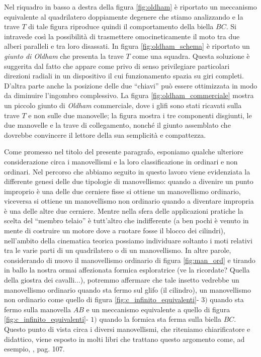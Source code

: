 \noindent Nel riquadro in basso a destra
della figura \ref{fig:oldham} \`e riportato un meccanismo equivalente
al quadrilatero doppiamente degenere che stiamo analizzando e 
la trave $T$ 
di tale figura riproduce quindi il comportamento della
biella $BC$.
\noindent Si intravede cos\`i la possibilit\`a di trasmettere
omocineticamente il moto
tra due alberi paralleli e tra loro disassati. In figura \ref{fig:oldham_schema}
\`e riportato un {\em giunto di Oldham} che presenta la trave $T$ come
una squadra. Questa soluzione \`e suggerita dal fatto che appare come privo di
senso privilegiare particolari direzioni radiali in un dispositivo il cui
funzionamento spazia su giri completi. D'altra
parte anche la posizione delle due ``chiavi'' pu\`o essere ottimizzata in modo
da diminuire l'ingombro complessivo. La figura \ref{fig:oldham_commerciale}
mostra un piccolo giunto di {\em Oldham} commerciale, dove i glifi sono stati
ricavati sulla trave $T$ e non sulle due manovelle; la figura mostra 
i tre componenti disgiunti, le due manovelle e la trave di collegamento,
nonch\'e il giunto
assemblato che dovrebbe convincere il lettore
della sua semplicit\`a e compattezza.

\noindent Come promesso nel titolo del presente paragrafo, esponiamo
qualche ulteriore considerazione circa i manovellismi e la loro classificazione
in ordinari e non ordinari. Nel percorso che abbiamo seguito in questo lavoro
viene evidenziata la differente genesi delle due tipologie di manovellismo:
quando a divenire un punto improprio \`e una delle due cerniere fisse
si ottiene un manovellismo ordinario, viceversa
si ottiene un manovellismo non ordinario quando a diventare impropria \`e
una delle altre due cerniere.  Mentre nella sfera delle applicazioni
pratiche la scelta del ``membro telaio'' \`e tutt'altro che indifferente (a
ben pochi \`e venuto in mente di costruire un motore dove a ruotare fosse
il blocco dei cilindri),
nell'ambito della cinematica teorica possiamo individuare soltanto
i moti relativi tra
le varie parti di un quadrilatero o di un manovellismo. In altre parole,
considerando di nuovo il manovellismo ordinario di figura \ref{fig:man_ord}
e tirando in ballo la nostra ormai affezionata formica esploratrice
(ve la ricordate? Quella della giostra dei cavalli...), potremmo
affermare che tale insetto vedrebbe un manovellismo ordinario quando
sta fermo sul glifo (il cilindro), un manovellismo non ordinario 
come quello di figura \ref{fig:c_infinito_equivalenti}- $3)$ quando
sta fermo sulla manovella $AB$ e un meccanismo equivalente a quello di
figura  \ref{fig:c_infinito_equivalenti}- $1)$ quando la formica sta ferma 
sulla biella $BC$. 
Questo punto di vista circa i diversi manovellismi,
che riteniamo chiarificatore e
didattico, viene esposto in molti libri che trattano questo argomento come,
ad esempio, \cite{sesini1}, pag. 107.
\endinput 
